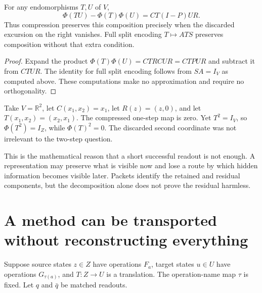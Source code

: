 \begin{Coreproposition}\label{Core:r:packet}
For any endomorphisms $T,U$ of $V$,
\[
\Phi(TU)-\Phi(T)\Phi(U)=CT(I-P)UR.
\]
Thus compression preserves this composition precisely when the discarded excursion on the right vanishes. Full split encoding $T\mapsto ATS$ preserves composition without that extra condition.
\end{Coreproposition}
\begin{proof}
Expand the product $\Phi(T)\Phi(U)=CTRCUR=CTPUR$ and subtract it from $CTUR$. The identity for full split encoding follows from $SA=I_V$ as computed above. These computations make no approximation and require no orthogonality.
\end{proof}

\begin{Corecounterexample}\label{Core:ce:return}
Take $V=\mathbb R^2$, let $C(x_1,x_2)=x_1$, let $R(z)=(z,0)$, and let $T(x_1,x_2)=(x_2,x_1)$. The compressed one-step map is zero. Yet $T^2=I_V$, so $\Phi(T^2)=I_Z$, while $\Phi(T)^2=0$. The discarded second coordinate was not irrelevant to the two-step question.
\end{Corecounterexample}

This is the mathematical reason that a short successful readout is not enough. A representation may preserve what is visible now and lose a route by which hidden information becomes visible later. Packets identify the retained and residual components, but the decomposition alone does not prove the residual harmless.

\section{A method can be transported without reconstructing everything}
Suppose source states $z\in Z$ have operations $F_a$, target states $u\in U$ have operations $G_{\tau(a)}$, and $T:Z\to U$ is a translation. The operation-name map $\tau$ is fixed. Let $q$ and $\bar q$ be matched readouts.

